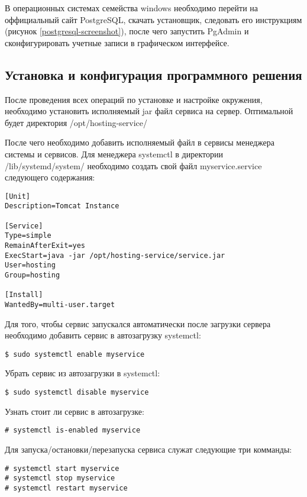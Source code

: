 В операционных системах семейства windows необходимо перейти на оффициальный сайт PostgreSQL, скачать установщик, следовать его инструкциям (рисунок \ref{postgresql-screenshot}), после чего запустить PgAdmin и сконфигурировать учетные записи в графическом интерфейсе.

\subsection{Установка и конфигурация программного решения}

После проведения всех операций по установке и настройке окружения, необходимо установить исполняемый jar файл сервиса на сервер.
Оптимальной будет директория /opt/hosting-service/

После чего необходимо добавить исполняемый файл в сервисы менеджера системы и сервисов.
Для менеджера systemctl в директории /lib/systemd/system/ необходимо создать свой файл myservice.service следующего содержания:

\begin{lstlisting}
[Unit]
Description=Tomcat Instance

[Service]
Type=simple
RemainAfterExit=yes
ExecStart=java -jar /opt/hosting-service/service.jar
User=hosting
Group=hosting

[Install]
WantedBy=multi-user.target
\end{lstlisting}

Для того, чтобы сервис запускался автоматически после загрузки сервера необходимо добавить сервис в автозагрузку systemctl:
\begin{lstlisting}
$ sudo systemctl enable myservice
\end{lstlisting}

Убрать сервис из автозагрузки в systemctl:
\begin{lstlisting}
$ sudo systemctl disable myservice
\end{lstlisting}

Узнать стоит ли сервис в автозагрузке:
\begin{lstlisting}
# systemctl is-enabled myservice
\end{lstlisting}

Для запуска/остановки/перезапуска сервиса служат следующие три комманды:
\begin{lstlisting}
# systemctl start myservice
# systemctl stop myservice
# systemctl restart myservice
\end{lstlisting}

